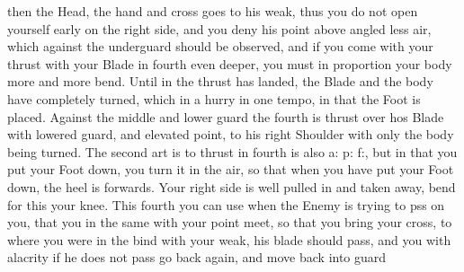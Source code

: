 then the Head, the hand and cross goes to his weak, thus you do not
open yourself early on the right side, and you deny his point above
angled less air,
which against the underguard should be observed, and if you come with
your thrust with your Blade in fourth even deeper, you must in
proportion your body more and more bend. Until in the thrust has
landed, the Blade and the body have completely turned, which in a
hurry in one tempo, in that the Foot is placed. Against the middle and
lower guard the fourth is thrust over hos Blade with lowered guard,
and elevated point, to his right Shoulder with only the body being turned.
The second art is to thrust in fourth is also a: p: f:, but in that
you put your Foot down, you turn it in the air, so that when you have
put your Foot down, the heel is forwards. Your right side is well
pulled in and taken away, bend for this your knee. This fourth you can
use when the Enemy is trying to pss on you, that you in the same with
your point meet, so that you bring your cross, to where you were in
the bind with your weak, his blade should pass, and you with alacrity
if he does not pass go back again, and move back into guard